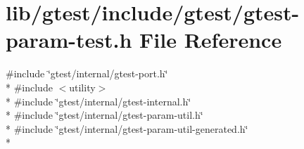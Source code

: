 \hypertarget{gtest-param-test_8h}{\section{lib/gtest/include/gtest/gtest-\/param-\/test.h File Reference}
\label{gtest-param-test_8h}
}
{\ttfamily \#include \char`\"{}gtest/internal/gtest-\/port.\-h\char`\"{}}\\*
{\ttfamily \#include $<$utility$>$}\\*
{\ttfamily \#include \char`\"{}gtest/internal/gtest-\/internal.\-h\char`\"{}}\\*
{\ttfamily \#include \char`\"{}gtest/internal/gtest-\/param-\/util.\-h\char`\"{}}\\*
{\ttfamily \#include \char`\"{}gtest/internal/gtest-\/param-\/util-\/generated.\-h\char`\"{}}\\*
